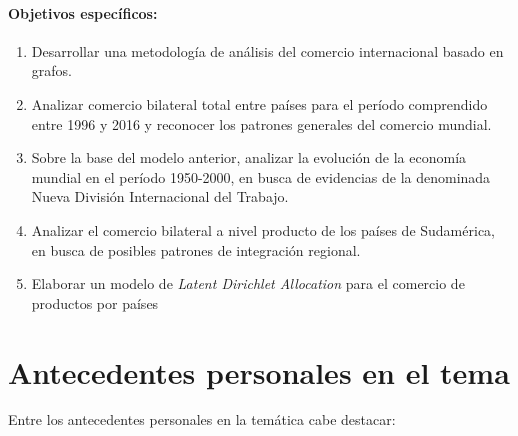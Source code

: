 \documentclass[runningheads,a4paper]{llncs}
\begin{document}
\par

\paragraph{\textbf{Objetivos específicos:}}

\begin{enumerate}
	\item Desarrollar una metodología de análisis del comercio internacional basado en grafos. 
	\item Analizar comercio bilateral total entre países para el período comprendido entre 1996 y 2016 y reconocer los patrones generales del comercio mundial.\\
	\item Sobre la base del modelo anterior, analizar la evolución de la economía mundial en el período 1950-2000, en busca de evidencias de la denominada Nueva División Internacional del Trabajo.\\
	\item Analizar el comercio bilateral a nivel producto de los países de Sudamérica, en busca de posibles patrones de integración regional.\\
	\item Elaborar un modelo de \textit{Latent Dirichlet Allocation} para el comercio de productos por países
\end{enumerate}


\section{Antecedentes personales en el tema}

Entre los antecedentes personales en la temática cabe destacar:
\end{document}
